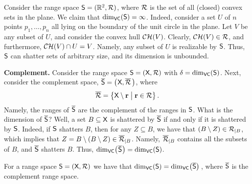 \begin{figure}[h]
    \centering%
    \caption{}
\end{figure}




Consider the range space $\mathsf{S} = (\mathbb{R}^2, {\mathcal{R}})$, where
${\mathcal{R}}$ is the set of all (closed) convex sets in the plane.  We
claim that $\mathrm{dim}_{\mathsf{VC}}(\mathsf{S})=\infty$. Indeed, consider a set $U$ of
$n$ points $p_1,\ldots, p_n$ all lying on the boundary of the unit circle in
the plane. Let $V$ be any subset of $U$, and consider the convex hull
$\CHX{V}$. Clearly, $\CHX{V} \in \RangeSet$, and furthermore,
$\CHX{V} \cap U = V$. Namely, any subset of $U$ is realizable by
$\mathsf{S}$. Thus, $\mathsf{S}$ can shatter sets of arbitrary size,
and its \VC dimension is unbounded.

\begin{figure}[h]
    \centering%
    \caption{}
\end{figure}

\bigskip%
\noindent%
\textbf{Complement.}  %
Consider the range space $\mathsf{S} = (\textsf{X}, {\mathcal{R}})$ with
$\delta =\mathrm{dim}_{\mathsf{VC}}(\mathsf{S})$. Next, consider the complement space,
$\overline{\mathsf{S}} = \bigl(\hspace{0.6pt}\textsf{X}, \overline{{\mathcal{R}}}\,
\bigr)$, where
\begin{equation*}
    \overline{\RangeSet}%
    =%
    \Set{\GroundSet \setminus \range }{ \range
       \in \RangeSet\bigr. }.
\end{equation*}
Namely, the ranges of $\overline{\mathsf{S}}$ are the complement of
the ranges in $\mathsf{S}$.  What is the \VC dimension of
$\overline{\mathsf{S}}$?  Well, a set $B \subseteq \textsf{X}$ is
shattered by $\overline{\mathsf{S}}$ if and only if it is shattered
by $\mathsf{S}$. Indeed, if $\mathsf{S}$ shatters $B$, then for any
$Z \subseteq B$, we have that
$(B \setminus Z) \in {\mathcal{R}}_{|B}$, which implies that
$Z = {B \setminus  (B \setminus Z)} \in
\overline{{\mathcal{R}}}_{|B}$. Namely,
$\overline{{\mathcal{R}}}_{|B}$ contains all the subsets of $B$,
and $\overline{\mathsf{S}}$ shatters $B$.  Thus,
$\mathrm{dim}_{\mathsf{VC}}\bigl( \hspace{0.6pt} \overline{\mathsf{S}} \hspace{0.6pt} \bigr) = \mathrm{dim}_{\mathsf{VC}}(
\mathsf{S})$.

\begin{lemma}
    For a range space $\mathsf{S} = (\textsf{X}, {\mathcal{R}})$ we have
    that $\VCDim(\RangeSpace) = \VCDim
    \pth{\overline{\RangeSpace}}\,$, where $\overline{\mathsf{S}}$ is
    the complement range space.    
\end{lemma}


